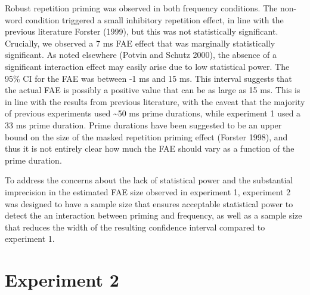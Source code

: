 \documentclass[
]{interact}
\begin{document}
Robust repetition priming was observed in both frequency conditions. The
non-word condition triggered a small inhibitory repetition effect, in
line with the previous literature Forster (1999), but this was not
statistically significant. Crucially, we observed a 7 ms FAE effect that
was marginally statistically significant. As noted elsewhere (Potvin and
Schutz 2000), the absence of a significant interaction effect may easily
arise due to low statistical power. The 95\% CI for the FAE was between
-1 ms and 15 ms. This interval suggests that the actual FAE is possibly
a positive value that can be as large as 15 ms. This is in line with the
results from previous literature, with the caveat that the majority of
previous experiments used \textasciitilde50 ms prime durations, while
experiment 1 used a 33 ms prime duration. Prime durations have been
suggested to be an upper bound on the size of the masked repetition
priming effect (Forster 1998), and thus it is not entirely clear how
much the FAE should vary as a function of the prime duration.

To address the concerns about the lack of statistical power and the
substantial imprecision in the estimated FAE size observed in experiment
1, experiment 2 was designed to have a sample size that ensures
acceptable statistical power to detect the an interaction between
priming and frequency, as well as a sample size that reduces the width
of the resulting confidence interval compared to experiment 1.

\section{Experiment 2}\label{experiment-2}
\end{document}
